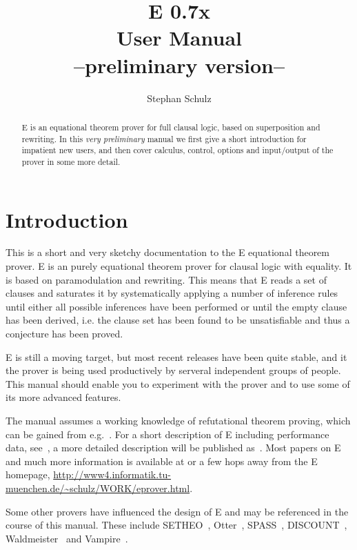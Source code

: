 \documentclass{article}
\author{Stephan Schulz}
\title{E 0.7x\\[1.5ex]User Manual\\[1.5ex]{\normalsize --preliminary
    version--}}
\begin{document}
\maketitle{}

\begin{abstract}
  E is an equational theorem prover for full clausal logic, based on
  superposition and rewriting. In this \emph{very preliminary} manual
  we first give a short introduction for impatient new users, and then
  cover calculus, control, options and input/output of the prover in
  some more detail.
\end{abstract}

\tableofcontents{}

\section{Introduction}
\label{sec:intro}

This is a short and very sketchy documentation to the E equational
theorem prover. E is an purely equational theorem prover for clausal
logic with equality. It is based on paramodulation and rewriting. This
means that E reads a set of clauses and saturates it by systematically
applying a number of inference rules until either all possible
inferences have been performed or until the empty clause has been
derived, i.e. the clause set has been found to be unsatisfiable and
thus a conjecture has been proved.

E is still a moving target, but most recent releases have been quite
stable, and it the prover is being used productively by serveral
independent groups of people. This manual should enable you to
experiment with the prover and to use some of its more advanced
features.

The manual assumes a working knowledge of refutational theorem
proving, which can be gained from e.g.~\cite{CL73}. For a short
description of E including performance data,
see~\cite{Schulz:IJCAR-2001}, a more detailed description will be
published as~\cite{Schulz:AICOM-2002}. Most papers on E and much more
information is available at or a few hops away from the E homepage,
\url{http://www4.informatik.tu-muenchen.de/~schulz/WORK/eprover.html}.

Some other provers have influenced the design of E and may be
referenced in the course of this manual. These include
SETHEO~\cite{MILSGSM:JAR-97}, Otter~\cite{Mc94,MW:JAR-97},
SPASS~\cite{WGR96,WABCEKTT:CADE-99}, DISCOUNT~\cite{DKS97},
Waldmeister~\cite{BHF96,HJL:CADE-99} and
Vampire~\cite{RV:AICOM-2002,RV:IJCAR-2001}.
\end{document}
